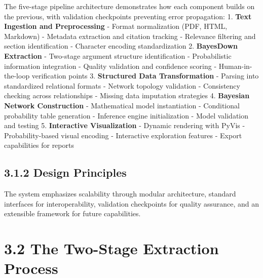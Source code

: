 \documentclass[
  11pt,
  letterpaper,
]{book}
\begin{document}
The five-stage pipeline architecture demonstrates how each component
builds on the previous, with validation checkpoints preventing error
propagation: 1. \textbf{Text Ingestion and Preprocessing} - Format
normalization (PDF, HTML, Markdown) - Metadata extraction and citation
tracking - Relevance filtering and section identification - Character
encoding standardization 2. \textbf{BayesDown Extraction} - Two-stage
argument structure identification - Probabilistic information
integration - Quality validation and confidence scoring -
Human-in-the-loop verification points 3. \textbf{Structured Data
Transformation} - Parsing into standardized relational formats - Network
topology validation - Consistency checking across relationships -
Missing data imputation strategies 4. \textbf{Bayesian Network
Construction} - Mathematical model instantiation - Conditional
probability table generation - Inference engine initialization - Model
validation and testing 5. \textbf{Interactive Visualization} - Dynamic
rendering with PyVis - Probability-based visual encoding - Interactive
exploration features - Export capabilities for reports

\subsection*{3.1.2 Design Principles}\label{sec-design-principles}

\begin{tcolorbox}[enhanced jigsaw, arc=.35mm, titlerule=0mm, breakable, toprule=.15mm, toptitle=1mm, colframe=quarto-callout-tip-color-frame, coltitle=black, bottomrule=.15mm, bottomtitle=1mm, opacityback=0, title=\textcolor{quarto-callout-tip-color}{\faLightbulb}\hspace{0.5em}{Core Design Philosophy}, rightrule=.15mm, leftrule=.75mm, colback=white, colbacktitle=quarto-callout-tip-color!10!white, opacitybacktitle=0.6, left=2mm]

The system emphasizes scalability through modular architecture, standard
interfaces for interoperability, validation checkpoints for quality
assurance, and an extensible framework for future capabilities.

\end{tcolorbox}

\section*{3.2 The Two-Stage Extraction
Process}\label{sec-two-stage-extraction}
\end{document}
